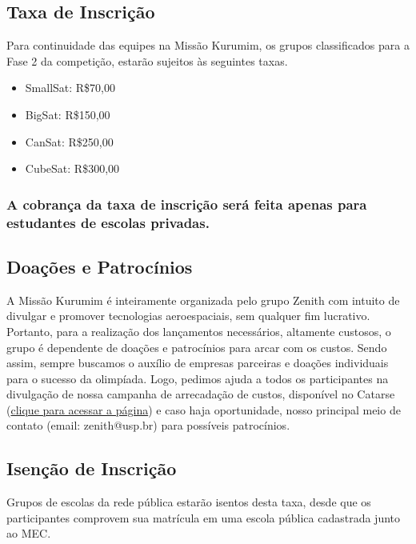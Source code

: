     \subsection{Taxa de Inscrição}\label{sec: taxa}

        \par Para continuidade das equipes na Missão Kurumim, os grupos classificados 
        para a Fase 2 da competição, estarão sujeitos às seguintes taxas.

        \begin{itemize}
            \item SmallSat: R\$70,00
            \item BigSat: R\$150,00
            \item CanSat: R\$250,00
            \item CubeSat: R\$300,00
        \end{itemize}

        \subsubsection*{A cobrança da taxa de inscrição será feita apenas para estudantes 
        de escolas privadas.}\label{sec:taxa_privada}

    \subsection{Doações e Patrocínios}\label{sec:doacoes}
        \par A Missão Kurumim é inteiramente organizada pelo grupo Zenith com intuito de 
        divulgar e promover tecnologias aeroespaciais, sem qualquer fim lucrativo. Portanto,
        para a realização dos lançamentos necessários, altamente custosos, o grupo é dependente
        de doações e patrocínios para arcar com os custos. Sendo assim, sempre buscamos o auxílio 
        de empresas parceiras e doações individuais para o sucesso da olimpíada. Logo, pedimos ajuda 
        a todos os participantes na divulgação de nossa campanha de arrecadação de custos, disponível 
        no Catarse (\href{https://www.catarse.me/missao_kurumim_2025?ref=project_link}{clique para acessar a página}) e caso haja oportunidade, nosso principal meio de 
        contato (email: zenith@usp.br) para possíveis patrocínios.

    \subsection{Isenção de Inscrição}\label{sec:isencao}
        \par Grupos de escolas da rede pública estarão isentos desta taxa, desde que os participantes 
        comprovem sua matrícula em uma escola pública cadastrada junto ao MEC.


